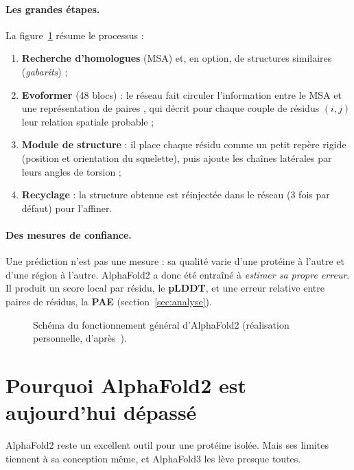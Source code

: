\paragraph{Les grandes étapes.} La figure~\ref{fig:schema} résume le processus :
\begin{enumerate}
  \item \textbf{Recherche d'homologues} (MSA) et, en option, de structures similaires (\emph{gabarits}) ;
  \item \textbf{Evoformer} (48 blocs) : le réseau fait circuler l'information entre le MSA et une \og représentation de paires \fg{}, qui décrit pour chaque couple de résidus $(i,j)$ leur relation spatiale probable ;
  \item \textbf{Module de structure} : il place chaque résidu comme un petit repère rigide (position et orientation du squelette), puis ajoute les chaînes latérales par leurs angles de torsion ;
  \item \textbf{Recyclage} : la structure obtenue est réinjectée dans le réseau (3 fois par défaut) pour l'affiner.
\end{enumerate}

\paragraph{Des mesures de confiance.} Une prédiction n'est pas une mesure : sa qualité varie d'une protéine à l'autre et d'une région à l'autre. AlphaFold2 a donc été entraîné à \emph{estimer sa propre erreur}. Il produit un score local par résidu, le \textbf{pLDDT}, et une erreur relative entre paires de résidus, la \textbf{PAE} (section~\ref{sec:analyse}).

\begin{figure}[H]
  \centering
  \resizebox{0.85\textwidth}{!}{}
  \caption{Schéma du fonctionnement général d'AlphaFold2 (réalisation personnelle, d'après~\cite{jumper2021,ebi_course}).}
  \label{fig:schema}
\end{figure}


\section{Pourquoi AlphaFold2 est aujourd'hui dépassé}

AlphaFold2 reste un excellent outil pour une protéine isolée. Mais ses limites tiennent à sa conception même, et AlphaFold3 les lève presque toutes.

